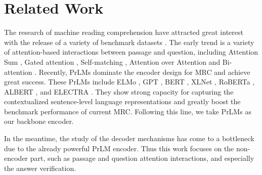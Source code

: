 \documentclass[letterpaper]{article} %
\begin{document}
\section{Related Work}
The research of machine reading comprehension have attracted great interest with the release of a variety of benchmark datasets \cite{hill2015goldilocks,hermann2015teaching,Rajpurkar2016SQuAD,Joshi2017TriviaQA,Rajpurkar2018Know,lai2017race}. %
The early trend is a variety of attention-based interactions between passage and question, %
including Attention Sum \cite{kadlec2016text}, Gated attention \cite{Dhingra2017Gated}, Self-matching  \cite{Wang2017Gated}, Attention over Attention \cite{Cui2017Attention} and Bi-attention  \cite{Seo2016Bidirectional}.
Recently, PrLMs dominate the encoder design for MRC and achieve great success. These PrLMs include ELMo \cite{peters2018deep}, GPT \cite{radford2018improving}, BERT \cite{devlin2018bert}, XLNet \cite{yang2019xlnet},  RoBERTa \cite{liu2019roberta}, ALBERT \cite{Lan2020ALBERT}, and ELECTRA \cite{clark2019electra}. They show strong capacity for capturing the contextualized sentence-level language representations and greatly boost the benchmark performance of current MRC. 
Following this line, we take PrLMs as our backbone encoder.

In the meantime, the study of the decoder mechanisms has come to a bottleneck due to the already powerful PrLM encoder. %
Thus this work focuses on the non-encoder part, such as passage and question attention interactions, and especially the answer verification. %
\end{document}
